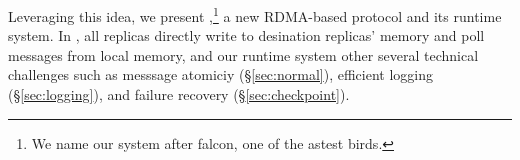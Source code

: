 %
%
%

Leveraging this idea, we present \xxx,\footnote{We name our system after
falcon, one of the astest birds.} a new RDMA-based \paxos protocol and its
runtime system. In \xxx, all replicas directly write to desination
replicas' memory and poll messages from local memory, and our runtime system
other several technical challenges such as messsage atomiciy
(\S\ref{sec:normal}), efficient logging (\S\ref{sec:logging}), and failure
recovery (\S\ref{sec:checkpoint}).

